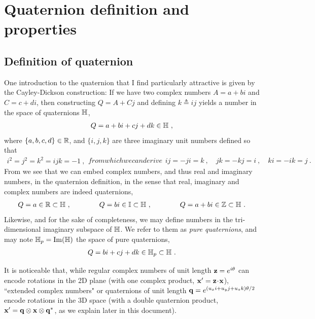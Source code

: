

\section{Quaternion definition and properties}

\subsection{Definition of quaternion}

One introduction to the quaternion that I find particularly attractive  is given by the Cayley-Dickson construction: 
If we have two complex numbers $A=a+bi$ and $C=c+di$, then constructing $Q=A+Cj$ and defining $k\triangleq ij$ yields a number in the space of quaternions ${\mathbb H}$,
%
\begin{align}
Q = a + bi + cj + dk \in{\mathbb H} ~, \label{equ:ijkQuat}
\end{align}%
%
where $\{a,b,c,d\}\in{\mathbb R}$, and $\{i,j,k\}$ are three imaginary unit numbers defined so that
%
\begin{subequations}
\label{equ:quatAlgebra}
\begin{align}
i^2=j^2=k^2=ijk=-1~,
\end{align}%
%
from which we can derive
%
\begin{align}
ij = -ji = k ~, \quad jk=-kj=i~, \quad ki=-ik=j~.
\end{align}
\end{subequations}
%
From  we see that we can embed complex numbers, and thus real and imaginary numbers, in the quaternion definition, in the sense that real, imaginary and complex numbers are indeed quaternions,
%
\begin{align}
Q = a \in {\mathbb R} \subset {\mathbb H}~,
\qquad\qquad 
Q=bi \in {\mathbb I} \subset {\mathbb H}~,
\qquad\qquad 
Q=a+bi \in {\mathbb Z} \subset {\mathbb H}~.
\end{align}
%
Likewise, and for the sake of completeness, we may define numbers in the tri-dimensional imaginary subspace of ${\mathbb H}$.
We refer to them as \emph{pure quaternions}, and may note ${\mathbb H}_p=\operatorname{Im}({\mathbb H})$ the space of pure quaternions,
%
\begin{align}
Q=bi+cj+dk \in{\mathbb H}_p \subset{\mathbb H}~.
\end{align}


It is noticeable that, while regular complex numbers of unit length ${\bf z}=e^{i\theta}$ can encode rotations in the 2D plane (with one complex product, ${\bf x}'={\bf z}\!\cdot\!{\bf x}$), ``extended complex numbers" or quaternions of unit length ${\bf q}=e^{(u_xi+u_yj+u_zk)\theta/2}$ encode rotations in the 3D space (with a double quaternion product, ${\bf x}'={\bf q}\otimes{\bf x}\otimes{\bf q}^*$, as we explain later in this document). 



